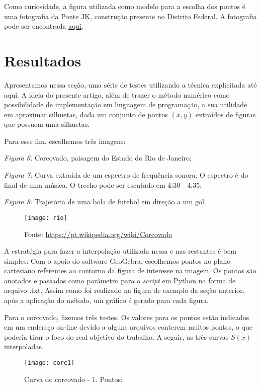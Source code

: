 \documentclass[11pt]{article}
\begin{document}
Como curiosidade, a figura utilizada como modelo para a escolha dos
pontos é uma fotografia da Ponte JK, construção presente no Distrito Federal.
A fotografia pode ser encontrada \href{http://wbrasilia.com/PonteJK.htm}{aqui}. 

\section{Resultados}

Apresentamos nessa seção, uma série de testes utilizando a técnica explicitada até aqui.
A ideia do presente artigo, além de trazer o método numérico como possibilidade
de implementação em linguagem de programação, a sua utilidade em aproximar
silhuetas, dada um conjunto de pontos $(x, y)$ extraídos de figuras que 
possuem uma silhuetas.

Para esse fim, escolhemos três imagens:

\textit{Figura 6:} Corcovado, paisagem do Estado do Rio de Janeiro;

\textit{Figura 7:} Curva extraída de um espectro de frequência sonora.
O espectro é do final de uma música. O trecho pode ser escutado em
4:30 - 4:35;

\textit{Figura 8:} Trajetória de uma bola de futebol em direção a um gol.

\begin{figure}[h]
\centering
\texttt{[image: rio]}
\caption{\small Fonte: \url{https://pt.wikipedia.org/wiki/Corcovado}}
\end{figure} 

A estratégia para fazer a interpolação utilizada nessa e nas restantes
é bem simples: Com o apoio do software GeoGebra, escolhemos pontos no
plano cartesiano referentes ao contorno da figura de interesse na imagem.
Os pontos são anotados e passados como parâmetro para o \textit{script}
em Python na forma de arquivo .txt. Assim como foi realizado na figura
de exemplo da seção anterior, após a aplicação do método, um gráfico é
gerado para cada figura.

Para o corcovado, fizemos três testes. Os valores para os pontos estão
indicados em um endereço on-line devido a alguns arquivos conterem
muitos pontos, o que poderia tirar o foco do real objetivo do trabalho.
A seguir, as três curvas $S(x)$ interpoladas.

\begin{figure}[!ht]
\centering
\texttt{[image: corc1]}
\caption{\small Curva do corcovado - 1. Pontos: \url{}}
\end{figure}
\end{document}

